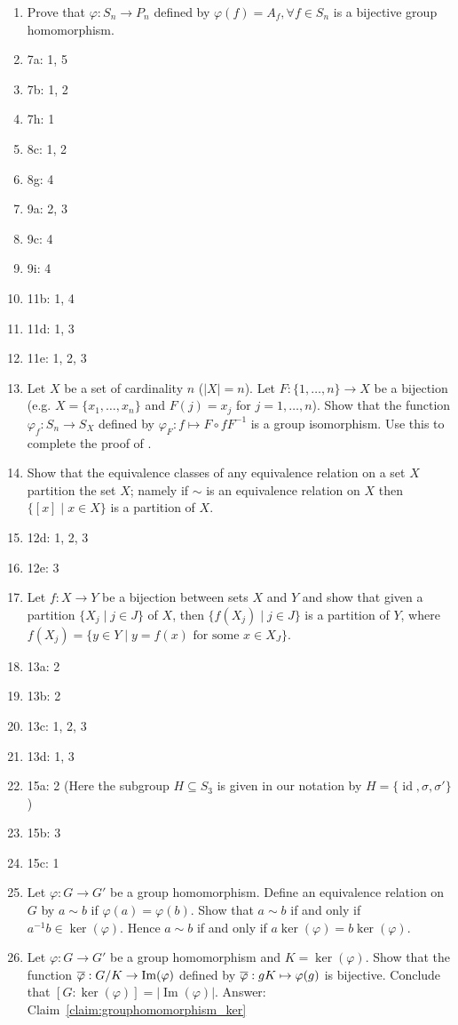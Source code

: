 \documentclass[12pt,letterpaper,DIV=11,final]{scrartcl}
\theoremstyle{plain}
\theoremstyle{definition}
\theoremstyle{remark}
\DeclareMathOperator{\id}{id}
\DeclareMathOperator{\ima}{Im}
\begin{document}
\begin{enumerate}
  \item Prove that $\varphi : S_n \to P_n$ defined by $\varphi(f) = A_f, \forall f \in S_n$ is a bijective group homomorphism.
  \item 7a: 1, 5
  \item 7b: 1, 2
  \item 7h: 1
  \item 8c: 1, 2

  \item 8g: 4
  \item 9a: 2, 3
  \item 9c: 4
  \item 9i: 4
  \item 11b: 1, 4

  \item 11d: 1, 3
  \item 11e: 1, 2, 3
  \item Let $X$ be a set of cardinality $n$ ($|X| = n$).
    Let $F : \{ 1, \dots, n \} \to X$ be a bijection (e.g. $X = \{ x_1, \dots, x_n \}$ and $F(j) = x_j$ for $j = 1, \dots, n$).
    Show that the function $\varphi_f : S_n \to S_X$ defined by $\varphi_F : f \mapsto F \circ f F^{-1}$ is a group isomorphism.
    Use this to complete the proof of .

  \item Show that the equivalence classes of any equivalence relation on a set $X$ partition the set $X$;
    namely if $\sim$ is an equivalence relation on $X$ then $\{ [x] \mid x \in X \}$ is a partition of $X$.
  \item 12d: 1, 2, 3
  \item 12e: 3
  \item Let $f : X \to Y$ be a bijection between sets $X$ and $Y$ and show that given a partition $\{ X_j \mid j \in J \}$ of $X$,
    then $\{ f(X_j) \mid j \in J \}$ is a partition of $Y$, where $f(X_j) = \{ y \in Y \mid y = f(x) \text{ for some } x \in X_J \} $.
  \item 13a: 2
  \item 13b: 2
  \item 13c: 1, 2, 3
  \item 13d: 1, 3

  \item 15a: 2 (Here the subgroup $H \subseteq S_3$ is given in our notation by $H = \{ \id, \sigma, \sigma' \}$)
  \item 15b: 3
  \item 15c: 1
  \item Let $\varphi: G \to G'$ be a group homomorphism.
    Define an equivalence relation on $G$ by $a \sim b$ if $\varphi(a) = \varphi(b)$.
    Show that $a \sim b$ if and only if $a^{-1} b \in \ker(\varphi)$.
    Hence $a \sim b$ if and only if $a \ker(\varphi) = b \ker(\varphi)$.
  \item Let $\varphi: G \to G'$ be a group homomorphism and $K = \ker(\varphi)$.
    Show that the function $\varphibar : G/K \to \ima(\varphi)$ defined by $\overline{\varphi} : gK \mapsto \varphi(g)$ is bijective.
    Conclude that $[G : \ker(\varphi)] = |\ima(\varphi)|$.
    Answer: Claim~\ref{claim:grouphomomorphism_ker}


\end{enumerate}
\end{document}
